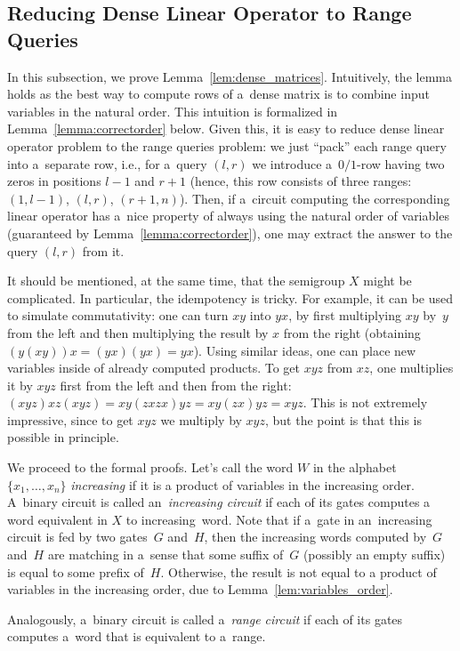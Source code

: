 \documentclass[11pt,letterpaper]{article}
\begin{document}
\subsection{Reducing Dense Linear Operator to Range Queries} \label{sec:operators_to_queries}
In this subsection, we prove Lemma~\ref{lem:dense_matrices}. Intuitively, the lemma holds as the best way to compute rows of a~dense matrix is to combine input variables in the natural order. This intuition is formalized in Lemma~\ref{lemma:correctorder} below. Given this, it is easy to reduce dense linear operator problem to the range queries problem: we just ``pack'' each range query into a~separate row, i.e., for a~query $(l,r)$ we introduce a~$0/1$-row having two zeros in positions $l-1$ and $r+1$ (hence, this row consists of three ranges: $(1,l-1)$, $(l,r)$, $(r+1,n)$). Then, if a~circuit computing the corresponding linear operator has a~nice property of always using the natural order of variables (guaranteed by Lemma~\ref{lemma:correctorder}), one may extract the answer to the query $(l,r)$ from it.

It should be mentioned, at the same time, that the semigroup $X$ might be complicated. In particular, the idempotency is tricky. For example, it can be used to simulate commutativity: one can turn $xy$ into $yx$, by first multiplying $xy$ by~$y$ from the left and then multiplying the result by $x$ from the right (obtaining $(y(xy))x=(yx)(yx)=yx$). Using similar ideas, one can place new variables inside of already computed products. To get $xyz$ from $xz$, one multiplies it by $xyz$ first from the left and then from the right: $(xyz)xz(xyz)=xy(zxzx)yz=xy(zx)yz=xyz$.
This is not extremely impressive, since to get $xyz$ we multiply by $xyz$, but the point is that this is possible in principle.

We proceed to the formal proofs. Let's call the word $W$ in the alphabet $\{x_1,\ldots,x_n\}$ \emph{increasing} if it is a product of variables in the increasing order. A~binary circuit is called an~{\em increasing circuit} if each of its gates computes a word equivalent in $X$ to increasing~word.
Note that if a~gate in an~increasing circuit is fed by two gates~$G$ and~$H$, then the increasing words computed by~$G$ and~$H$ are matching in a~sense that some suffix of~$G$ (possibly an empty suffix) is equal to some prefix of~$H$. Otherwise, the result is not equal to a product of variables in the increasing order, due to Lemma~\ref{lem:variables_order}.

Analogously, a~binary circuit is called a~{\em range circuit} if each of its gates computes a~word that is equivalent to a~range.
\end{document}

